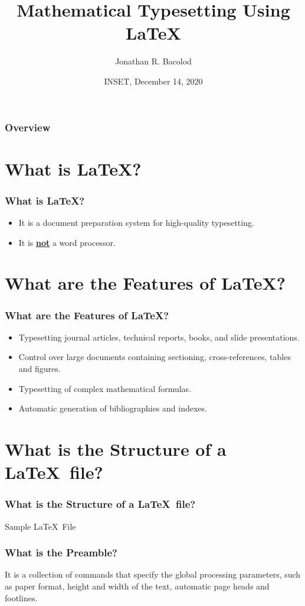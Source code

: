 \documentclass[17pt]{beamer}
\title[Math Typesetting Using \LaTeX] {Mathematical Typesetting Using \LaTeX}
\author{Jonathan R. Bacolod}
\institute[SHS]{Sauyo High School}
\date[INSET, Dec. 2020]{INSET, December 14, 2020}
\begin{document}
	\frame{\titlepage}

	\begin{frame}
		\frametitle{Overview}
		\tableofcontents 
	\end{frame}

	\section{What is \LaTeX?}
    \begin{frame}
    	\frametitle{What is \LaTeX?}
    	\begin{itemize}
    		\item It is a document preparation system for high-quality typesetting.
    		\item \pause It is \textbf{\underline{not}} a word processor.
    	\end{itemize}
    \end{frame}	

	\section{What are the Features of \LaTeX?}
	\begin{frame}
		\frametitle{What are the Features of \LaTeX?}
		\footnotesize
		\begin{itemize}
			\item Typesetting journal articles, technical reports, books, and slide presentations.
			\item \pause Control over large documents containing sectioning, cross-references, tables and figures.
			\item \pause Typesetting of complex mathematical formulas.
			\item \pause Automatic generation of bibliographies and indexes.
		\end{itemize}
	\end{frame}	
	
	\section{What is the Structure of a \LaTeX\ file?}
	\begin{frame}
		\frametitle{What is the Structure of a \LaTeX\ file?}
		Sample \LaTeX\ File
		
	
	
	\end{frame}

	\begin{frame}
		\frametitle{What is the Preamble?}
		
		
		
		It is a collection of commands that specify the global processing parameters, such as paper format, height and width of the text, automatic page heads and footlines.
		
	\end{frame}	
\end{document}
